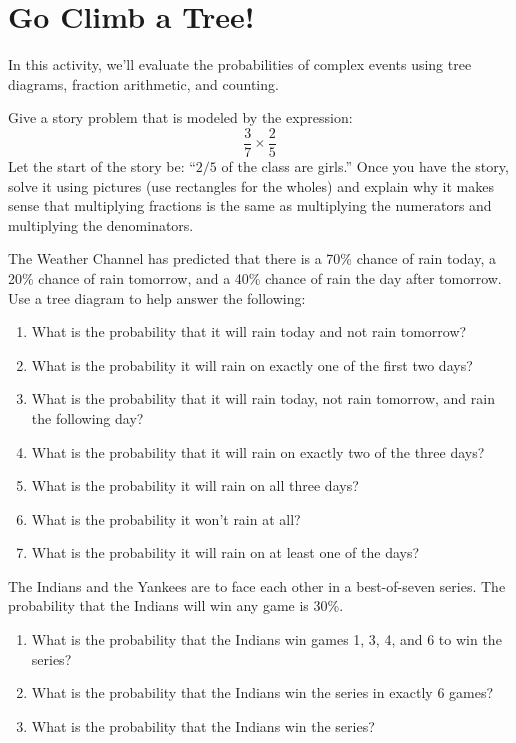 \newpage
\section{Go Climb a Tree!} 

In this activity, we'll evaluate the probabilities of complex events
using tree diagrams, fraction arithmetic, and counting.

\begin{prob}
Give a story problem that is modeled by the expression:
\[
\frac{3}{7} \times \frac{2}{5}
\]  
Let the start of the story be: ``$2/5$ of the class are girls.''  Once
you have the story, solve it using pictures (use rectangles for the
wholes) and explain why it makes sense that multiplying fractions is
the same as multiplying the numerators and multiplying the
denominators.
\end{prob}

\begin{prob}
The Weather Channel has predicted that there is a 70\% chance of rain today, a 20\% chance of rain tomorrow, and a 40\% chance of rain the day after tomorrow.  Use a tree diagram to help answer the following:
\begin{enumerate}
\item What is the probability that it will rain today and not rain tomorrow? 
\item What is the probability it will rain on exactly one of the first two days?
\item What is the probability that it will rain today, not rain tomorrow, and rain the following day?
\item What is the probability that it will rain on exactly two of the three days?
\item What is the probability it will rain on all three days?
\item What is the probability it won't rain at all?
\item What is the probability it will rain on at least one of the days?
\end{enumerate}
\end{prob}

\begin{prob}
The Indians and the Yankees are to face each other in a best-of-seven series.  The probability that the Indians will win any game is 30\%.
\begin{enumerate}
\item What is the probability that the Indians win games 1, 3, 4, and 6 to win the series?
\item What is the probability that the Indians win the series in exactly 6 games?
\item What is the probability that the Indians win the series?
\end{enumerate}
\end{prob}

